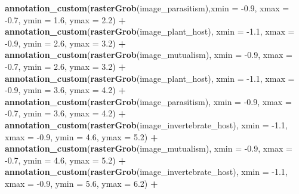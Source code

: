 \documentclass[
]{article}
\newenvironment{Shaded}{\begin{snugshade}}{\end{snugshade}}
\newcommand{\DataTypeTok}[1]{\textcolor[rgb]{0.13,0.29,0.53}{#1}}
\newcommand{\FloatTok}[1]{\textcolor[rgb]{0.00,0.00,0.81}{#1}}
\newcommand{\KeywordTok}[1]{\textcolor[rgb]{0.13,0.29,0.53}{\textbf{#1}}}
\newcommand{\NormalTok}[1]{#1}
\newcommand{\OperatorTok}[1]{\textcolor[rgb]{0.81,0.36,0.00}{\textbf{#1}}}
\newcommand{\StringTok}[1]{\textcolor[rgb]{0.31,0.60,0.02}{#1}}
\begin{document}
\begin{Shaded}
\begin{Highlighting}[]
{{{{{\StringTok{  }\KeywordTok{annotation_custom}\NormalTok{(}\KeywordTok{rasterGrob}\NormalTok{(image_parasitism),}\DataTypeTok{xmin =} \FloatTok{-0.9}\NormalTok{, }\DataTypeTok{xmax =} \FloatTok{-0.7}\NormalTok{, }\DataTypeTok{ymin =} \FloatTok{1.6}\NormalTok{, }\DataTypeTok{ymax =} \FloatTok{2.2}\NormalTok{) }\OperatorTok{+}
\StringTok{  }\KeywordTok{annotation_custom}\NormalTok{(}\KeywordTok{rasterGrob}\NormalTok{(image_plant_host), }\DataTypeTok{xmin =} \FloatTok{-1.1}\NormalTok{, }\DataTypeTok{xmax =} \FloatTok{-0.9}\NormalTok{, }\DataTypeTok{ymin =} \FloatTok{2.6}\NormalTok{, }\DataTypeTok{ymax =} \FloatTok{3.2}\NormalTok{) }\OperatorTok{+}\StringTok{ }
\StringTok{  }\KeywordTok{annotation_custom}\NormalTok{(}\KeywordTok{rasterGrob}\NormalTok{(image_mutualism), }\DataTypeTok{xmin =} \FloatTok{-0.9}\NormalTok{, }\DataTypeTok{xmax =} \FloatTok{-0.7}\NormalTok{, }\DataTypeTok{ymin =} \FloatTok{2.6}\NormalTok{, }\DataTypeTok{ymax =} \FloatTok{3.2}\NormalTok{) }\OperatorTok{+}\StringTok{ }
\StringTok{  }\KeywordTok{annotation_custom}\NormalTok{(}\KeywordTok{rasterGrob}\NormalTok{(image_plant_host), }\DataTypeTok{xmin =} \FloatTok{-1.1}\NormalTok{, }\DataTypeTok{xmax =} \FloatTok{-0.9}\NormalTok{, }\DataTypeTok{ymin =} \FloatTok{3.6}\NormalTok{, }\DataTypeTok{ymax =} \FloatTok{4.2}\NormalTok{) }\OperatorTok{+}
\StringTok{  }\KeywordTok{annotation_custom}\NormalTok{(}\KeywordTok{rasterGrob}\NormalTok{(image_parasitism), }\DataTypeTok{xmin =} \FloatTok{-0.9}\NormalTok{, }\DataTypeTok{xmax =} \FloatTok{-0.7}\NormalTok{, }\DataTypeTok{ymin =} \FloatTok{3.6}\NormalTok{, }\DataTypeTok{ymax =} \FloatTok{4.2}\NormalTok{) }\OperatorTok{+}
\StringTok{  }\KeywordTok{annotation_custom}\NormalTok{(}\KeywordTok{rasterGrob}\NormalTok{(image_invertebrate_host), }\DataTypeTok{xmin =} \FloatTok{-1.1}\NormalTok{, }\DataTypeTok{xmax =} \FloatTok{-0.9}\NormalTok{, }\DataTypeTok{ymin =} \FloatTok{4.6}\NormalTok{, }\DataTypeTok{ymax =} \FloatTok{5.2}\NormalTok{) }\OperatorTok{+}
\StringTok{  }\KeywordTok{annotation_custom}\NormalTok{(}\KeywordTok{rasterGrob}\NormalTok{(image_mutualism), }\DataTypeTok{xmin =} \FloatTok{-0.9}\NormalTok{, }\DataTypeTok{xmax =} \FloatTok{-0.7}\NormalTok{, }\DataTypeTok{ymin =} \FloatTok{4.6}\NormalTok{, }\DataTypeTok{ymax =} \FloatTok{5.2}\NormalTok{) }\OperatorTok{+}
\StringTok{  }\KeywordTok{annotation_custom}\NormalTok{(}\KeywordTok{rasterGrob}\NormalTok{(image_invertebrate_host), }\DataTypeTok{xmin =} \FloatTok{-1.1}\NormalTok{, }\DataTypeTok{xmax =} \FloatTok{-0.9}\NormalTok{, }\DataTypeTok{ymin =} \FloatTok{5.6}\NormalTok{, }\DataTypeTok{ymax =} \FloatTok{6.2}\NormalTok{) }\OperatorTok{+}\StringTok{ }
}}}}}
\end{Highlighting}
\end{Shaded}
\end{document}
